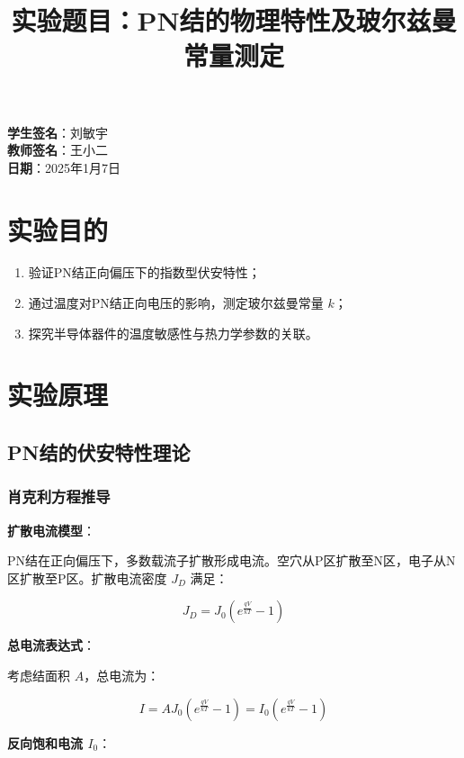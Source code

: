\documentclass[12pt,a4paper]{article}
\title{实验题目：PN结的物理特性及玻尔兹曼常量测定}
\author{}
\date{}
\begin{document}
\maketitle

\textbf{学生签名}：刘敏宇\\
\textbf{教师签名}：王小二\\
\textbf{日期}：2025年1月7日

\section{实验目的}

\begin{enumerate}
\item 验证PN结正向偏压下的指数型伏安特性；
\item 通过温度对PN结正向电压的影响，测定玻尔兹曼常量 $k$；
\item 探究半导体器件的温度敏感性与热力学参数的关联。
\end{enumerate}

\section{实验原理}

\subsection{PN结的伏安特性理论}

\subsubsection{肖克利方程推导}

\textbf{扩散电流模型}：

PN结在正向偏压下，多数载流子扩散形成电流。空穴从P区扩散至N区，电子从N区扩散至P区。扩散电流密度 $J_D$ 满足：

\begin{equation}
J_D = J_0 \left( e^{\frac{qV}{kT}} - 1 \right)
\end{equation}

\textbf{总电流表达式}：

考虑结面积 $A$，总电流为：

\begin{equation}
I = A J_0 \left( e^{\frac{qV}{kT}} - 1 \right) = I_0 \left( e^{\frac{qV}{kT}} - 1 \right) \tag{1}
\end{equation}

\textbf{反向饱和电流 $I_0$}：
\end{document}
